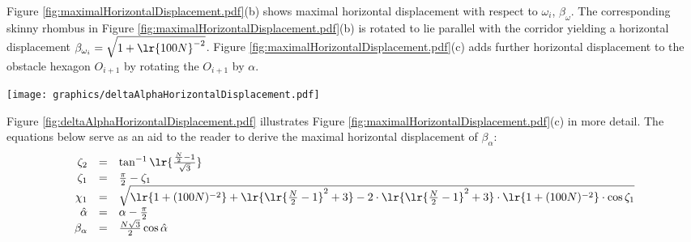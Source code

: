 Figure \ref{fig:maximalHorizontalDisplacement.pdf}(b) shows maximal horizontal displacement with respect to $\omega_i$, $\beta_\omega$.  
The corresponding skinny rhombus in Figure \ref{fig:maximalHorizontalDisplacement.pdf}(b) is rotated to lie parallel with the corridor yielding a horizontal displacement $\beta_{\omega_i} = \sqrt{1 + \lr{100N}^{-2} }$.  
Figure \ref{fig:maximalHorizontalDisplacement.pdf}(c) adds further horizontal displacement to the obstacle hexagon $O_{i+1}$ by rotating the $O_{i+1}$ by $\alpha$.  

\begin{minipage}{\linewidth}
\begin{center}
\texttt{[image: graphics/deltaAlphaHorizontalDisplacement.pdf]}
\label{fig:deltaAlphaHorizontalDisplacement.pdf}
\end{center}
\end{minipage}

Figure \ref{fig:deltaAlphaHorizontalDisplacement.pdf} illustrates Figure \ref{fig:maximalHorizontalDisplacement.pdf}(c) in more detail.  
The equations below serve as an aid to the reader to derive the maximal horizontal displacement of $\beta_\alpha$:
$$
\begin{array}{rcl}
\zeta_2 &=& \tan^{-1} \lr{\frac{\frac{N}{2}-1}{\sqrt{3}}}\\
\zeta_1 &=& \frac{\pi}{2} - \zeta_1\\
\chi_1 &=& \sqrt{\lr{1+(100N)^{-2}} + \lr{\lr{\frac{N}{2}-1}^2 + 3} - 2 \cdot \lr{\lr{\frac{N}{2}-1}^2 + 3}\cdot \lr{1+(100N)^{-2}}  \cdot \cos \zeta_1       }\\
\hat{\alpha} &=& \alpha - \frac{\pi}{2}\\
\beta_\alpha &=& \frac{N\sqrt{3}}{2} \cos \hat{\alpha}
\end{array}
$$

